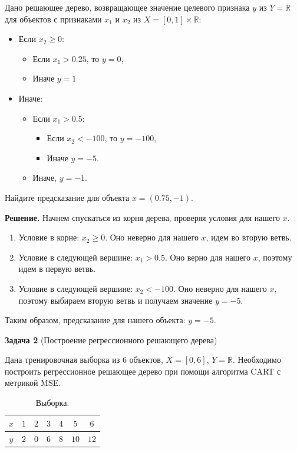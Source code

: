 Дано решающее дерево, возвращающее значение целевого признака $y$ из $Y = \mathbb{R}$ для объектов с признаками $x_1$ и $x_2$ из $X = [0, 1] \times \mathbb{R}$:
\begin{itemize}
    \item Если $x_2 \geq 0$:
          \begin{itemize}
              \item Если $x_1 > 0.25$, то $y = 0$,
              \item Иначе $y = 1$
          \end{itemize}
    \item Иначе:
          \begin{itemize}
              \item Если $x_1 > 0.5$:
                    \begin{itemize}
                        \item Если $x_2 < -100$, то $y = -100$,
                        \item Иначе $y = -5$.
                    \end{itemize}
              \item Иначе, $y = -1$.
          \end{itemize}
\end{itemize}

Найдите предсказание для объекта $x = (0.75, -1)$.

\textbf{Решение.}
Начнем спускаться из корня дерева, проверяя условия для нашего $x$.
\begin{enumerate}
    \item Условие в корне: $x_2 \geq 0$. Оно неверно для нашего $x$, идем во вторую ветвь.
    \item Условие в следующей вершине: $x_1 > 0.5$. Оно верно для нашего $x$, поэтому идем в первую ветвь.
    \item Условие в следующей вершине: $x_2 < -100$. Оно неверно для нашего $x$, поэтому выбираем вторую ветвь и получаем значение $y = -5$.
\end{enumerate}

Таким образом, предсказание для нашего объекта: $y = -5$.


\textbf{Задача 2} (Построение регрессионного решающего дерева)

Дана тренировочная выборка из 6 объектов, $X = [0, 6]$, $Y = \mathbb{R}$. Необходимо построить регрессионное решающее дерево при помощи алгоритма CART с метрикой MSE.
\begin{table}[h]
    \centering
    \caption{Выборка.}
    \begin{tabular}{|c|c|c|c|c|c|c|}
        \hline
        $x$ & $1$ & $2$ & $3$ & $4$ & $5$  & $6$  \\
        \hline
        $y$ & $2$ & $0$ & $6$ & $8$ & $10$ & $12$ \\
        \hline
    \end{tabular}
\end{table}

